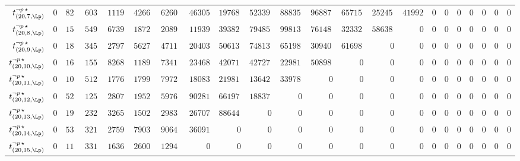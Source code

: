 \begin{tabular}{r|rrrrrrrrrrrrrrrrrrrrr}
  $t^{\neg p \, \star}_{(20,7,\Lp)}$ & $0$ & $828288$ & $6037793864$ & $1119779737761$ & $42660900991852$ & $626073571070425$ & $4630503384287466$ & $19768462210065849$ & $52339676352280968$ & $88835809212845856$ & $96887840068661040$ & $65715694236506160$ & $25245749935264320$ & $4199277668826240$ & $0$ & $0$ & $0$ & $0$ & $0$ & $0$ & $0$ \\
  $t^{\neg p \, \star}_{(20,8,\Lp)}$ & $0$ & $1505449$ & $5497975254$ & $673985933556$ & $18729599451016$ & $208974664409950$ & $1193959264491780$ & $3938285909323402$ & $7948535820098928$ & $9981335959202772$ & $7614876074941080$ & $3233221471093680$ & $586385735585760$ & $0$ & $0$ & $0$ & $0$ & $0$ & $0$ & $0$ & $0$ \\
  $t^{\neg p \, \star}_{(20,9,\Lp)}$ & $0$ & $1879873$ & $3458630346$ & $279781689822$ & $5627006102704$ & $47113107147960$ & $204039329937708$ & $506131159792349$ & $748132452145528$ & $651989708381430$ & $309409716730380$ & $61698206006580$ & $0$ & $0$ & $0$ & $0$ & $0$ & $0$ & $0$ & $0$ & $0$ \\
  $t^{\neg p \, \star}_{(20,10,\Lp)}$ & $0$ & $1672260$ & $1555522232$ & $82685893191$ & $1189914337044$ & $7341862627825$ & $23468831699142$ & $42071054125772$ & $42727261451968$ & $22981813126758$ & $5089855667500$ & $0$ & $0$ & $0$ & $0$ & $0$ & $0$ & $0$ & $0$ & $0$ & $0$ \\
  $t^{\neg p \, \star}_{(20,11,\Lp)}$ & $0$ & $1088846$ & $512638340$ & $17767920660$ & $179948567076$ & $797282931540$ & $1808323192062$ & $2198165721290$ & $1364220314248$ & $339787881477$ & $0$ & $0$ & $0$ & $0$ & $0$ & $0$ & $0$ & $0$ & $0$ & $0$ & $0$ \\
  $t^{\neg p \, \star}_{(20,12,\Lp)}$ & $0$ & $528832$ & $125840052$ & $2807650869$ & $19528958676$ & $59768298375$ & $90281882898$ & $66197339040$ & $18837557376$ & $0$ & $0$ & $0$ & $0$ & $0$ & $0$ & $0$ & $0$ & $0$ & $0$ & $0$ & $0$ \\
  $t^{\neg p \, \star}_{(20,13,\Lp)}$ & $0$ & $193877$ & $23208038$ & $326534247$ & $1502710300$ & $2983703490$ & $2670795612$ & $886444104$ & $0$ & $0$ & $0$ & $0$ & $0$ & $0$ & $0$ & $0$ & $0$ & $0$ & $0$ & $0$ & $0$ \\
  $t^{\neg p \, \star}_{(20,14,\Lp)}$ & $0$ & $53909$ & $3215962$ & $27597978$ & $79034568$ & $90643350$ & $36091692$ & $0$ & $0$ & $0$ & $0$ & $0$ & $0$ & $0$ & $0$ & $0$ & $0$ & $0$ & $0$ & $0$ & $0$ \\
  $t^{\neg p \, \star}_{(20,15,\Lp)}$ & $0$ & $11352$ & $331176$ & $1636965$ & $2600976$ & $1294125$ & $0$ & $0$ & $0$ & $0$ & $0$ & $0$ & $0$ & $0$ & $0$ & $0$ & $0$ & $0$ & $0$ & $0$ & $0$ \\

\end{tabular}
